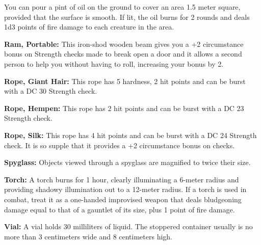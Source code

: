 You can pour a pint of oil on the ground to cover an area 1.5 meter square, provided that the surface is smooth. If lit, the oil burns for 2 rounds and deals 1d3 points of fire damage to each creature in the area.

\textbf{Ram, Portable:} This iron-shod wooden beam gives you a +2 circumstance bonus on Strength checks made to break open a door and it allows a second person to help you without having to roll, increasing your bonus by 2.

\textbf{Rope, Giant Hair:} This rope has 5 hardness, 2 hit points and can be burst with a DC 30 Strength check.

\textbf{Rope, Hempen:} This rope has 2 hit points and can be burst with a DC 23 Strength check.

\textbf{Rope, Silk:} This rope has 4 hit points and can be burst with a DC 24 Strength check. It is so supple that it provides a +2 circumstance bonus on  checks.

\textbf{Spyglass:} Objects viewed through a spyglass are magnified to twice their size.

\textbf{Torch:} A torch burns for 1 hour, clearly illuminating a 6-meter radius and providing shadowy illumination out to a 12-meter radius. If a torch is used in combat, treat it as a one-handed improvised weapon that deals bludgeoning damage equal to that of a gauntlet of its size, plus 1 point of fire damage.

\textbf{Vial:} A vial holds 30 milliliters of liquid. The stoppered container usually is no more than 3 centimeters wide and 8 centimeters high.
